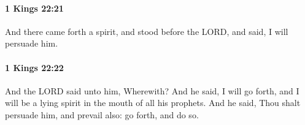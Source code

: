 		\paragraph{1 Kings 22:21} %
			\label{1KINGS-22-21}

			And there came forth a spirit, and stood before the LORD, and said, I will persuade him.


		\paragraph{1 Kings 22:22} %
			\label{1KINGS-22-22}

			And the LORD said unto him, Wherewith? And he said, I will go forth, and I will be a lying spirit in the mouth of all his prophets. And he said, Thou shalt persuade him, and prevail also: go forth, and do so.


